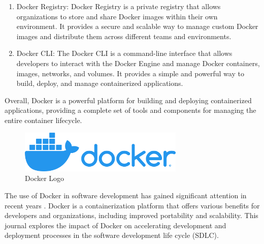 \begin{enumerate}
    \item Docker Registry: Docker Registry is a private registry that allows organizations to store and share Docker images within their own environment. It provides a secure and scalable way to manage custom Docker images and distribute them across different teams and environments.
    \item Docker CLI: The Docker CLI is a command-line interface that allows developers to interact with the Docker Engine and manage Docker containers, images, networks, and volumes. It provides a simple and powerful way to build, deploy, and manage containerized applications.
\end{enumerate}

Overall, Docker is a powerful platform for building and deploying containerized applications, providing a complete set of tools and components for managing the entire container lifecycle.

\begin{figure}[h]
    \centering
    \includegraphics[width=0.7\textwidth]{./resources/images/horizontal-logo-monochromatic-white.png}
    \caption{Docker Logo}
    \label{fig:docker-logo}
\end{figure}

\clearpage

The use of Docker in software development has gained significant attention in recent years \cite{merkel2014docker,boettiger2015introduction}. Docker is a containerization platform that offers various benefits for developers and organizations, including improved portability and scalability. This journal explores the impact of Docker on accelerating development and deployment processes in the software development life cycle (SDLC). 
